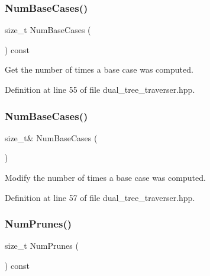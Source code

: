 \subsubsection{Num\+Base\+Cases()\hspace{0.1cm}{\footnotesize\ttfamily [1/2]}}
{\footnotesize\ttfamily size\+\_\+t Num\+Base\+Cases (\begin{DoxyParamCaption}{ }\end{DoxyParamCaption}) const\hspace{0.3cm}{\ttfamily [inline]}}



Get the number of times a base case was computed. 



Definition at line 55 of file dual\+\_\+tree\+\_\+traverser.\+hpp.

\mbox{\label{classmlpack_1_1tree_1_1Octree_1_1DualTreeTraverser_a56b8f525584ea0bf262fa6e413fe3672}} 
\subsubsection{Num\+Base\+Cases()\hspace{0.1cm}{\footnotesize\ttfamily [2/2]}}
{\footnotesize\ttfamily size\+\_\+t\& Num\+Base\+Cases (\begin{DoxyParamCaption}{ }\end{DoxyParamCaption})\hspace{0.3cm}{\ttfamily [inline]}}



Modify the number of times a base case was computed. 



Definition at line 57 of file dual\+\_\+tree\+\_\+traverser.\+hpp.

\mbox{\label{classmlpack_1_1tree_1_1Octree_1_1DualTreeTraverser_ac2f6072011ee31a0a32f62e2a105a347}} 
\subsubsection{Num\+Prunes()\hspace{0.1cm}{\footnotesize\ttfamily [1/2]}}
{\footnotesize\ttfamily size\+\_\+t Num\+Prunes (\begin{DoxyParamCaption}{ }\end{DoxyParamCaption}) const\hspace{0.3cm}{\ttfamily [inline]}}




